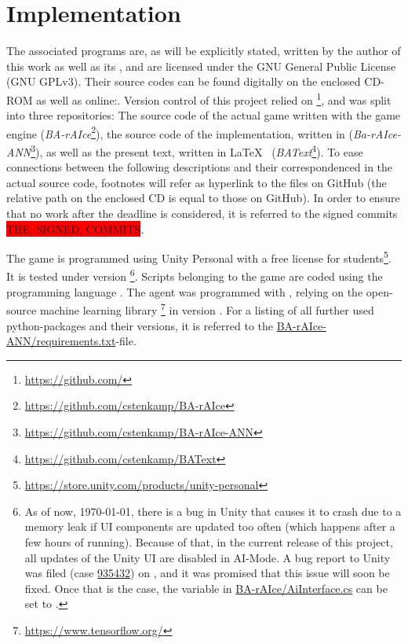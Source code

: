 \section{Implementation}

\label{ch:implementation}

The associated programs are, as will be explicitly stated, written by the author of this work as well as its \leonbase, and are licensed under the GNU General Public License (GNU GPLv3). Their source codes can be found digitally on the enclosed CD-ROM as well as online:. Version control of this project relied on \footnote{\url{https://github.com/}}, and was split into three repositories: The source code of the actual game written with the game engine  (\textit{BA-rAIce}\footnote{\url{https://github.com/cstenkamp/BA-rAIce}}), the source code of the implementation, written in  (\textit{Ba-rAIce-ANN}\footnote{\url{https://github.com/cstenkamp/BA-rAIce-ANN}}), as well as the present text, written in \LaTeX ~ (\textit{BAText}\footnote{\url{https://github.com/cstenkamp/BAText}}). To ease connections between the following descriptions and their correspondenced in the actual source code, footnotes will refer as hyperlink to the files on GitHub (the relative path on the enclosed CD is equal to those on GitHub). In order to ensure that no work after the deadline is considered, it is referred to the signed commits \colorbox{red}{THE, SIGNED, COMMITS}.

The game is programmed using Unity Personal with a free license for students\footnote{\url{https://store.unity.com/products/unity-personal}}. It is tested under version \footnote{As of now, \today, there is a bug in Unity that causes it to crash due to a memory leak if UI components are updated too often (which happens after a few hours of running). Because of that, in the current release of this project, all updates of the Unity UI are disabled in AI-Mode. A bug report to Unity was filed (case \href{https://fogbugz.unity3d.com/default.asp?935432_h1bir10rkmbc658k}{935432}) on , and it was promised that this issue will soon be fixed. Once that is the case, the variable  in \href{https://github.com/cstenkamp/BA-rAIce/blob/ef2dc018f36cd9ad65df90e65d8ab840c822567e/Assets/Scripts/AiInterface.cs\#L12-L13}{BA-rAIce/AiInterface.cs} can be set to .}.
Scripts belonging to the game are coded using the programming language . The agent was programmed with , relying on the open-source machine learning library \cite{abadi_tensorflow:_2015}\footnote{\url{https://www.tensorflow.org/}} in version . For a listing of all further used python-packages and their versions, it is referred to the \href{https://github.com/cstenkamp/BA-rAIce-ANN/blob/master/requirements.txt}{BA-rAIce-ANN/requirements.txt}-file. 

